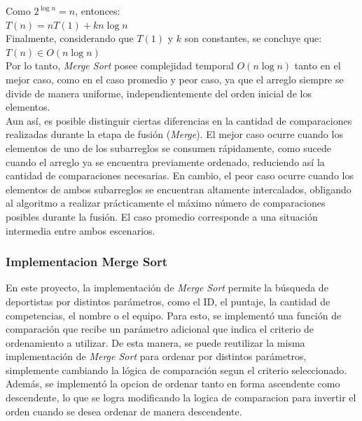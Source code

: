 Como $2^{\log n} = n$, entonces: \\

$T(n) = nT(1) + kn\log n$ \\

Finalmente, considerando que $T(1)$ y $k$ son constantes, se concluye que: \\

$T(n) \in O(n \log n)$ \\

Por lo tanto, \textit{Merge Sort} posee complejidad temporal $O(n \log n)$ tanto en el mejor caso, como en el caso promedio y peor caso, ya que el arreglo 
siempre se divide de manera uniforme, independientemente del orden inicial de los elementos. \\

Aun así, es posible distinguir ciertas diferencias en la cantidad de comparaciones realizadas durante la etapa de fusión (\textit{Merge}). El mejor caso ocurre 
cuando los elementos de uno de los subarreglos se consumen rápidamente, como sucede cuando el arreglo ya se encuentra previamente ordenado, reduciendo así la
cantidad de comparaciones necesarias.  En cambio, el peor caso ocurre cuando los elementos de ambos subarreglos se encuentran altamente intercalados, obligando 
al algoritmo a realizar prácticamente el máximo número de comparaciones posibles durante la fusión.  El caso promedio corresponde a una situación intermedia 
entre ambos escenarios. \\

\subsubsection{Implementacion Merge Sort}
En este proyecto, la implementación de \textit{Merge Sort} permite la búsqueda de deportistas por distintos parámetros, como el ID, el puntaje, la cantidad 
de competencias, el nombre o el equipo.  Para esto, se implementó una función de comparación que recibe un parámetro adicional que indica el criterio de 
ordenamiento a utilizar.  De esta manera, se puede reutilizar la misma implementación de \textit{Merge Sort} para ordenar por distintos parámetros, simplemente 
cambiando la lógica de comparación segun el criterio seleccionado.  Además, se implementó la opcion de ordenar tanto en forma ascendente como descendente, 
lo que se logra modificando la logica de comparacion para invertir el orden cuando se desea ordenar de manera descendente. \\

